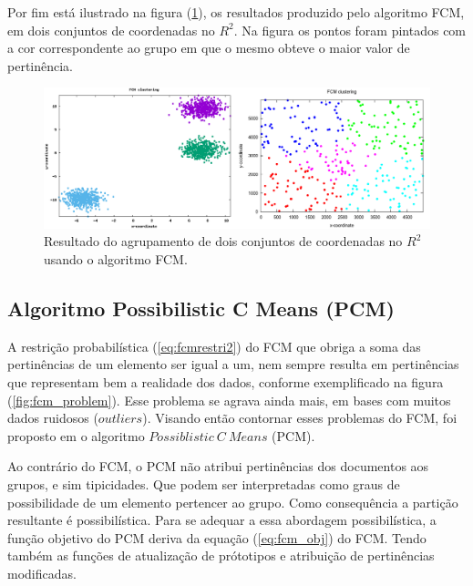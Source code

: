 Por fim está ilustrado na figura (\ref{fig:samples_fcm}), os resultados produzido pelo algoritmo
FCM, em dois conjuntos de coordenadas no $R^2$. Na figura os pontos foram pintados com a cor
correspondente ao grupo em que o mesmo obteve o maior valor de pertinência.

\begin{figure}[!htp] 
  \centering 
  \includegraphics[width=0.8\columnwidth]{assets/samples_fcm.png}
  \caption{Resultado do agrupamento de dois conjuntos de coordenadas no $R^2$ usando o algoritmo
  FCM\protect\footnotemark.} 
  \label{fig:samples_fcm} 
\end{figure}

\subsection{Algoritmo Possibilistic C Means (PCM)}

A restrição probabilística (\ref{eq:fcmrestri2}) do FCM que obriga a soma das pertinências de
um elemento ser igual a um, nem sempre resulta em pertinências que representam bem a realidade dos
dados, conforme exemplificado na figura (\ref{fig:fcm_problem}).  Esse problema se agrava ainda
mais, em bases com muitos dados ruidosos ($outliers$).  Visando então contornar esses problemas do
FCM, foi proposto em \cite{Krishnapuram1993} o algoritmo $Possiblistic\ C\ Means$ (PCM). 

Ao contrário do FCM, o PCM não atribui pertinências dos documentos aos grupos, e sim tipicidades. 
Que podem ser interpretadas como graus de possibilidade de um elemento pertencer ao grupo. Como
consequência a partição resultante é possibilística. Para se adequar a essa abordagem
possibilística, a função objetivo do PCM deriva da equação (\ref{eq:fcm_obj}) do FCM. Tendo também 
as funções de atualização de prótotipos e atribuição de pertinências modificadas.


